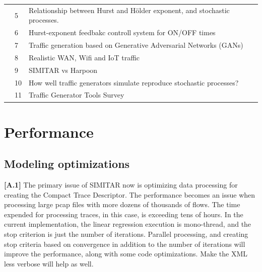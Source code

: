 \begin{table}[!ht]
\begin{tabular}{lll}
                                              & 5                          & Relationship between Hurst and Hölder exponent, and stochastic processes.           \\
                                              & \cellcolor[HTML]{EFEFEF}6  & \cellcolor[HTML]{EFEFEF}Hurst-exponent feedbakc controll system for ON/OFF times   \\
                                              & 7                          & Traffic generation based on  Generative Adversarial Networks (GANs)  \\
                                              & \cellcolor[HTML]{EFEFEF}8  & \cellcolor[HTML]{EFEFEF} Realistic WAN, Wifi and IoT traffic \\
                                              & 9                          & SIMITAR vs Harpoon \\
                                              & \cellcolor[HTML]{EFEFEF}10 & \cellcolor[HTML]{EFEFEF}  How well traffic generators simulate reproduce stochastic processes?\\ 
                                              & 11                          & Traffic Generator Tools Survey \\
                                              \hline
\end{tabular}
\end{table}



\section{Performance}


\subsection{Modeling optimizations}

\textbf{[A.1]} The primary issue of SIMITAR now is optimizing data processing for creating the Compact Trace Descriptor. The performance becomes an issue when processing large pcap files with more dozens of thousands of flows. The time expended for processing traces, in this case, is exceeding tens of hours. In the current implementation, the linear regression execution is mono-thread, and the stop criterion is just the number of iterations. Parallel processing, and creating stop criteria based on convergence in addition to the number of iterations will improve the performance, along with some code optimizations. Make the XML less verbose will help as well.

